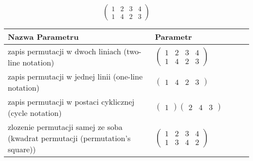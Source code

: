 \documentclass[12pt]{article}
\begin{document}
\subsection{}
\begin{center}
\[
\begin{pmatrix}
	1 & 2 & 3 & 4 \\ 
	1 & 4 & 2 & 3 
\end{pmatrix}
\]

\begin{tabular}{|m{0.6\linewidth}|m{0.4\linewidth}|}
	\hline
	Nazwa Parametru & Parametr \\
	\hline
	zapis permutacji w dwoch liniach (two-line notation) & $\begin{pmatrix} 1 & 2 & 3 & 4 \\ 
1 & 4 & 2 & 3 \end{pmatrix}$ \\ 
	\hline
	zapis permutacji w jednej linii (one-line notation) & $\begin{pmatrix} 1 & 4 & 2 & 3 \end{pmatrix}$ \\ 
	\hline
	zapis permutacji w postaci cyklicznej (cycle notation) & $\begin{pmatrix} 1 \end{pmatrix} \begin{pmatrix} 2 & 4 & 3 \end{pmatrix} $ \\ 
	\hline
	zlozenie permutacji samej ze soba (kwadrat permutacji (permutation's square)) & $\begin{pmatrix} 1 & 2 & 3 & 4 \\ 
1 & 3 & 4 & 2 \end{pmatrix}$ \\ 
	\hline
\end{tabular}
\end{center}
\end{document}
